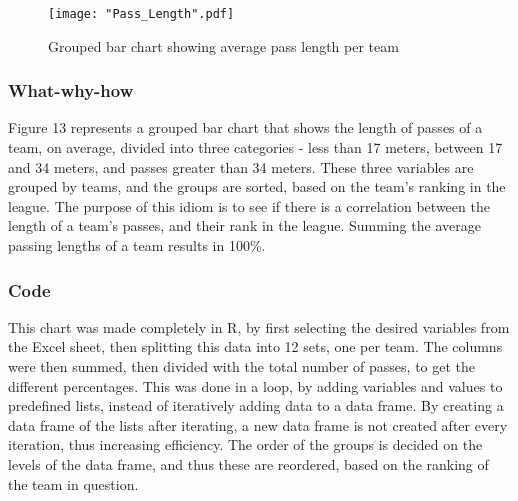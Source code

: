 \documentclass[Report.tex]{subfiles}
\begin{document}
\begin{figure}
\center
\texttt{[image: "Pass\_Length".pdf]}
\caption{Grouped bar chart showing average pass length per team}
\label{Fig:Pass_Length}
\end{figure}



\subsubsection{What-why-how}
Figure 13 represents a grouped bar chart that shows the length of passes of a team, on average,
divided into three categories - less than 17 meters, between 17 and 34 meters,
and passes greater than 34 meters. These three variables are grouped by teams,
and the groups are sorted, based on the team's ranking in the league.
The purpose of this idiom is to see if there is a correlation between the length
of a team's passes, and their rank in the league.
Summing the average passing lengths of a team results in 100\%. 

\subsubsection{Code}
This chart was made completely in R, by first selecting the desired variables
from the Excel sheet, then splitting this data into 12 sets, one per team. 
The columns were then summed, then divided with the total number of passes, to
get the different percentages. This was done in a loop, by adding variables and
values to predefined lists, instead of iteratively adding data to a data frame. 
By creating a data frame of the lists after iterating,
a new data frame is not created after every iteration, thus increasing
efficiency.
The order of the groups is decided on the levels of the data frame, and
thus these are reordered, based on the ranking of the team in question.
\end{document}
